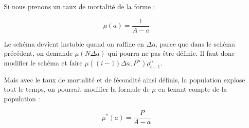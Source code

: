 \documentclass[paper=a4, french]{scrartcl} %
\numberwithin{equation}{section} %
\numberwithin{figure}{section} %
\numberwithin{table}{section} %
\begin{document}
Si nous prenons un taux de mortalité de la forme :

\begin{equation}
\mu(a) = \frac{1}{A-a}
\end{equation}

Le schéma devient instable quand on raffine en $\Delta a$, parce que dans le schéma précédent, on demande $\mu(N\Delta a)$ qui pourra ne pas être définie. Il faut donc modifier le schéma et faire $\mu((i-1)\Delta a,P^n)\rho_{i-1}^{n}$.

Mais avec le taux de mortalité et de fécondité ainsi définis, la population explose tout le temps, on pourrait modifier la formule de $\mu$ en tenant compte de la population : 

\begin{equation}
\mu^*(a) = \frac{P}{A-a}
\end{equation}

\end{document}
